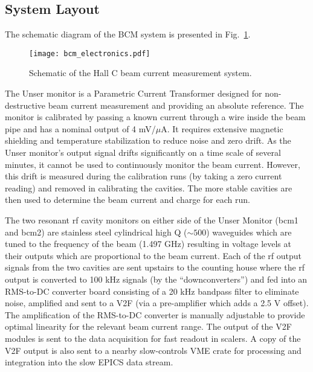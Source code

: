 {\subsection{System Layout}

The schematic diagram of the BCM system is presented in
Fig.~\ref{fig:hallc_bcm}.
\begin{figure}[h!]
\begin{center}
\texttt{[image: bcm\_electronics.pdf]}
\caption[Beam Current Measurement: Schematic]{Schematic of the Hall C beam
current measurement system.}
\label{fig:hallc_bcm}
\end{center}
\end{figure}

The Unser monitor is a Parametric Current Transformer designed for
non-destructive beam current measurement and providing an absolute
reference. The monitor is calibrated by passing a known current
through a wire inside the beam pipe and has a nominal output of 4
mV/$\mu $A. It requires extensive magnetic shielding and temperature
stabilization to reduce noise and zero drift. As the Unser monitor's
output signal drifts significantly on a time scale of several minutes,
it cannot be used to continuously monitor the beam current. However,
this drift is measured during the calibration runs (by taking a zero
current reading) and removed in calibrating the cavities.  The more
stable cavities are then used to determine the beam current and charge
for each run.

The two resonant rf cavity monitors on either side of the Unser
Monitor (bcm1 and bcm2) are stainless steel cylindrical high Q ($\sim
500$) waveguides which are tuned to the frequency of the beam (1.497
GHz) resulting in voltage levels at their outputs which are
proportional to the beam current. Each of the rf output signals from
the two cavities are sent upstairs to the counting house where the rf
output is converted to 100 kHz signals (by the ``downconverters'') and
fed into an RMS-to-DC converter board consisting of a 20 kHz bandpass
filter to eliminate noise, amplified and sent to a V2F (via a
pre-amplifier which adds a 2.5 V offset).  The amplification of the
RMS-to-DC converter is manually adjustable to provide optimal
linearity for the relevant beam current range.  The output of the V2F
modules is sent to the data acquisition for fast readout in scalers. A
copy of the V2F output is also sent to a nearby slow-controls VME
crate for processing and integration into the slow EPICS data stream.

}
